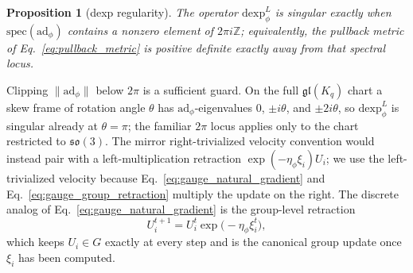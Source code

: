 \documentclass[11pt]{article}
\newtheorem{proposition}{Proposition}
\begin{document}
\begin{proposition}[dexp regularity]\label{prop:dexp_regularity}
The operator $\mathrm{dexp}^{L}_\phi$ is singular exactly when $\mathrm{spec}(\mathrm{ad}_\phi)$ contains a nonzero element of $2\pi i\mathbb{Z}$; equivalently, the pullback metric of Eq.~\eqref{eq:pullback_metric} is positive definite exactly away from that spectral locus.
\end{proposition}
Clipping $\|\mathrm{ad}_\phi\|$ below $2\pi$ is a sufficient guard. On the full $\mathfrak{gl}(K_q)$ chart a skew frame of rotation angle $\theta$ has $\mathrm{ad}_\phi$-eigenvalues $0$, $\pm i\theta$, and $\pm 2i\theta$, so $\mathrm{dexp}^{L}_\phi$ is singular already at $\theta = \pi$; the familiar $2\pi$ locus applies only to the chart restricted to $\mathfrak{so}(3)$. The mirror right-trivialized velocity convention would instead pair with a left-multiplication retraction $\exp(-\eta_\phi\xi_i)U_i$; we use the left-trivialized velocity because Eq.~\eqref{eq:gauge_natural_gradient} and Eq.~\eqref{eq:gauge_group_retraction} multiply the update on the right. The discrete analog of Eq.~\eqref{eq:gauge_natural_gradient} is the group-level retraction
\begin{equation}
U_i^{t+1} = U_i^t \exp\big(-\eta_\phi \xi_i^t\big),
\label{eq:gauge_group_retraction}
\end{equation}
which keeps $U_i \in G$ exactly at every step and is the canonical group update once $\xi_i$ has been computed.
\end{document}
